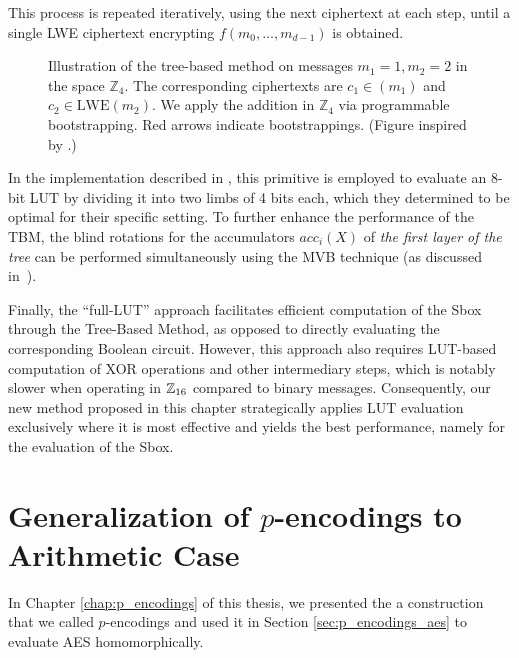 This process is repeated iteratively, using the next ciphertext at each step, until a single LWE ciphertext encrypting $f(m_0, \dots, m_{d-1})$ is obtained.  

\begin{figure}
    \centering
    \caption{Illustration of the tree-based method on messages  $m_1 = 1, m_2=2$ in the space  $\mathbb{Z}_4$. The corresponding ciphertexts are $c_1 \in \mathrm{}(m_1)$ and $c_2 \in \mathrm{LWE}(m_2)$. We apply the addition in $\mathbb{Z}_4$ via programmable bootstrapping. Red arrows indicate bootstrappings. (Figure inspired by \cite{DBLP:conf/wahc/TramaCBS23}.)}
    \label{fig:my_label}
\end{figure}

In the implementation described in \cite{DBLP:conf/wahc/TramaCBS23}, this primitive is employed to evaluate an 8-bit LUT by dividing it into two limbs of 4 bits each, which they determined to be optimal for their specific setting. 
%
To further enhance the performance of the TBM, the blind rotations for the accumulators $acc_i(X)$ of \emph{the first layer of the tree} can be performed simultaneously using the MVB technique (as discussed in~\cite{TCHES:GuiBorAra21}). 

Finally, the ``full-LUT'' approach facilitates efficient computation of the Sbox through the Tree-Based Method, as opposed to directly evaluating the corresponding Boolean circuit. However, this approach also requires LUT-based computation of XOR operations and other intermediary steps, which is notably slower when operating in $\mathbb{Z}_{16}$ compared to binary messages. Consequently, our new method \hippo{} proposed in this chapter strategically applies LUT evaluation exclusively where it is most effective and yields the best performance, namely for the evaluation of the Sbox.




\section{Generalization of $p$-encodings to Arithmetic Case}
\label{sec:generalization_p_encodings}


In Chapter \ref{chap:p_encodings} of this thesis, we presented the a construction that we called $p$-encodings and used it in Section \ref{sec:p_encodings_aes} to evaluate AES homomorphically. 

